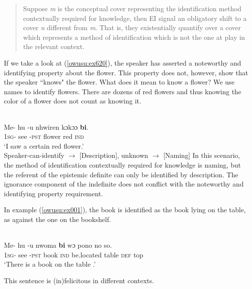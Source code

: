\documentclass[output=paper,modfonts,nonflat,draftmode]{langsci/langscibook}
\begin{document}
\begin{quote}Suppose \emph{m} is the conceptual cover representing the identification method contextually required for knowledge, then EI signal an obligatory shift to a cover \emph{n} different from \emph{m}. That is, they existentially quantify over a cover which represents a method of identification which is not the one at play in the relevant context. \citep[132]{AloniPort2015} \end{quote}

If we take a look at (\ref{owusu:ex620}), the speaker has asserted a noteworthy and identifying property about the flower.  This property does not, however, show that the speaker ``knows" the flower. What does it mean to know a flower? We use names to identify flowers. There are dozens of red flowers and thus knowing the color of a flower does not count as knowing it. 


\ea\label{owusu:ex620}\\
\gll Me- hu -u nhwiren kɔkɔɔ \textbf{bi}.\\
 \textsc{1sg}- see -\textsc{pst}  flower red \textsc{ind} \\
\glt `I saw a certain red flower.'\\
Speaker-can-identify $\rightarrow$ [Description], unknown $\rightarrow$  [Naming]
 \z  
In this scenario, the method of identification contextually required for knowledge is naming, but the referent of the epistemic definite can only be identified by description. The ignorance component of the indefinite does not conflict with the noteworthy and identifying property requirement.

In example (\ref{owusu:ex001}), the book is identified as the book lying on the table, as against the one on the bookshelf.

\ea\label{owusu:ex001}\\
\gll Me- hu -u nwoma \textbf{bi} wɔ pono no so.\\
	     \textsc{1sg}- see -\textsc{pst}  book \textsc{ind} be.located table \textsc{def}  top\\
\glt `There is a book on the table .'
 \z 
 
This sentence is (in)felicitous in different contexts.
\end{document}
